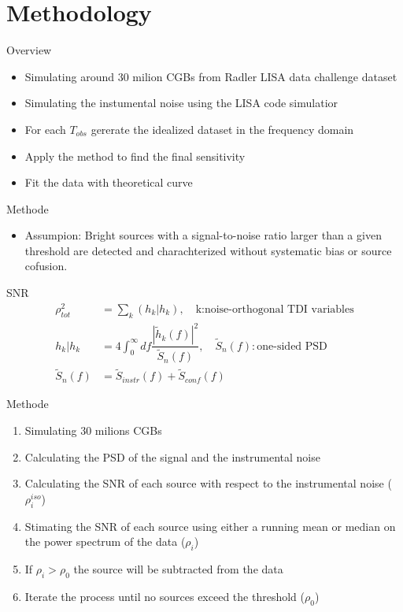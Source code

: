 \documentclass[pdf]{beamer}
\begin{document}
\section{Methodology}
\begin{frame}{Overview}
\begin{itemize}
\item Simulating around 30 milion CGBs from Radler LISA data challenge dataset
\item Simulating the instumental noise using the LISA code simulatior
\item For each $T_{obs}$ gererate the idealized dataset in the frequency domain
\item Apply the method to find the final sensitivity
\item Fit the data with theoretical curve
\end{itemize}
\end{frame}

\begin{frame}{Methode}
\begin{itemize}
\item Assumpion: Bright sources with a signal-to-noise ratio larger than a given threshold are detected and charachterized without systematic bias or source cofusion.
\end{itemize}
\begin{block}{SNR}
\begin{align*}
\rho^2_{tot} &= \sum_k (h_k|h_k), \quad  \text{k:noise-orthogonal TDI variables} \\
h_k|h_k &= 4 \int_{0}^{\infty} df \dfrac{|\tilde{h}_k(f)|^2}{\tilde{S}_n(f)}, \quad \tilde{S}_n(f):\text{one-sided PSD} \\
\tilde{S}_n(f) &= \tilde{S}_{instr}(f) +\tilde{S}_{conf}(f)
\end{align*}
\end{block}
\end{frame}

\begin{frame}{Methode}
\begin{enumerate}
\item Simulating 30 milions CGBs
\item Calculating the PSD of the signal and the instrumental noise
\item Calculating the SNR of each source with respect to the instrumental noise ($\rho_i^{iso}$)
\item Stimating the SNR of each source using either a running mean or median on the power spectrum of the data ($\rho_i$)
\item If $\rho_i > \rho_0$ the source will be subtracted from the data
\item Iterate the process until no sources exceed the threshold ($\rho_0$)
\end{enumerate}
\end{frame}
\end{document}
